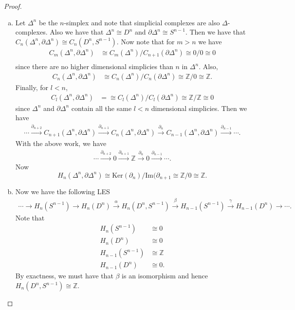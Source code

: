 \documentclass[leqno]{article}
\theoremstyle{nonumberplain}
\newtheorem{proof}{Proof}
\newcommand{\Z}{\mathbb{Z}}
\begin{document}
\begin{proof}~
\begin{enumerate}[(a)]
\item Let $\Delta^n$ be the $n$-simplex and note that simplicial complexes are also $\Delta$-complexes. Also we have that $\Delta^n\cong D^n$ and $\partial \Delta^n\cong S^{n-1}$.  Then we have that $C_n(\Delta^n,\partial \Delta^n)\cong C_n(D^n, S^{n-1})$. Now note that for $m>n$ we have
\begin{align*}
C_{m}(\Delta^n, \partial \Delta^n)&\cong C_{m}(\Delta^n)/C_{n+1}(\partial \Delta^n)\cong 0/0 \cong 0\\
\end{align*}since there are no higher dimensional simplicies than $n$ in $\Delta^n$. Also,
\begin{align*}
C_n(\Delta^n,\partial \Delta^n)&\cong C_n(\Delta^n)/C_n(\partial \Delta^n)\cong \Z/0\cong \Z.
\end{align*}
Finally, for $l<n$, 
\begin{align*}
C_l(\Delta^n,\partial \Delta^n)&=\cong C_l(\Delta^n)/C_l(\partial \Delta^n)\cong \Z/\Z\cong 0
\end{align*}
since $\Delta^n$ and $\partial \Delta^n$ contain all the same  $l<n$ dimensional simplicies. Then we have 
\begin{align*}
\cdots \xrightarrow{\partial_{n+2}} C_{n+1}(\Delta^n,\partial \Delta^n) \xrightarrow{\partial_{n+1}} C_n(\Delta^n,\partial \Delta^n) \xrightarrow{\partial_{n}} C_{n-1}(\Delta^n,\partial \Delta^n) \xrightarrow{\partial_{n-1}}\cdots.
\end{align*}
With the above work, we have
\begin{align*}
\cdots \xrightarrow{\partial_{n+2}} 0 \xrightarrow{\partial_{n+1}} \Z \xrightarrow{\partial_{n}} 0 \xrightarrow{\partial_{n-1}}\cdots.
\end{align*}
Now 
\[
H_n(\Delta^n,\partial \Delta^n)\cong\textrm{Ker}(\partial_n)/\textrm{Im}(\partial_{n+1}\cong \Z/0\cong \Z.
\]

\item Now we have the following LES
\begin{align*}
\cdots \rightarrow H_n(S^{n-1}) \rightarrow H_n(D^n)\xrightarrow{\alpha} H_n(D^n, S^{n-1}) \xrightarrow{\beta} H_{n-1}(S^{n-1})\xrightarrow{\gamma} H_{n-1}(D^n)\rightarrow \cdots.
\end{align*}
Note that 
\begin{align*}
H_n(S^{n-1})&\cong 0\\
H_n(D^n)&\cong 0\\
H_{n-1}(S^{n-1})&\cong \Z\\
H_{n-1}(D^n)&\cong 0.
\end{align*}
By exactness, we must have that $\beta$ is an isomorphism and hence $H_n(D^n,S^{n-1})\cong \Z$.
\end{enumerate}
\end{proof}
\end{document}
